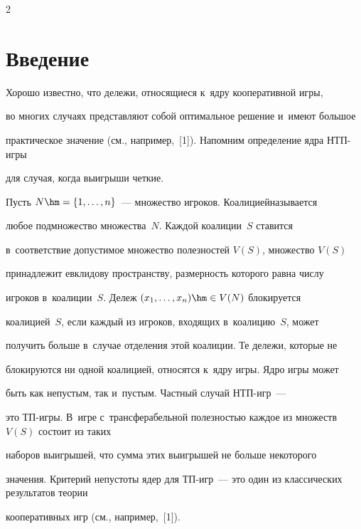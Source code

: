 \begin{multicols}{2}



\label{st\stat}

      

\section{Введение}



\vspace*{-3pt}



    Хорошо известно, что дележи, относящиеся к~ядру кооперативной игры, 

во многих случаях представляют собой оптимальное решение и~имеют большое 

практическое значение (см., например,~[1]). Напомним определение ядра НТП-иг\-ры\linebreak

    для случая, когда выигрыши четкие. 

Пусть $N\hm= \{1, \ldots , n\}$~--- множество игроков. Коалицией\linebreak называется 

любое подмножество множества~$N$. Каж\-дой коалиции~$S$ ставится 

в~соответствие допустимое множество полезностей $V(S)$, множество $V(S)$ 

принадлежит евклидову пространству, размерность которого равна числу 

игроков в~коалиции~$S$. Дележ $(x_1, \ldots ,x_n)\hm\in V(N)$ блокируется 

коалицией~$S$, если каждый из игроков, входящих в~коалицию~$S$, может 

получить больше в~случае отделения этой коалиции. Те дележи, которые не 

блокируются ни одной коалицией, относятся к~ядру игры. Ядро игры может 

быть как непустым, так и~пустым. Частный случай НТП-игр~--- 

это ТП-иг\-ры. В~игре с~трансферабельной полезностью каждое из множеств $V(S)$ состоит из таких 

наборов выигрышей, что сумма этих выигрышей не больше некоторого 

значения. Критерий непустоты ядер для ТП-игр~--- это один из классических результатов тео\-рии 

кооперативных игр (см., например,~[1]).




\end{multicols}
